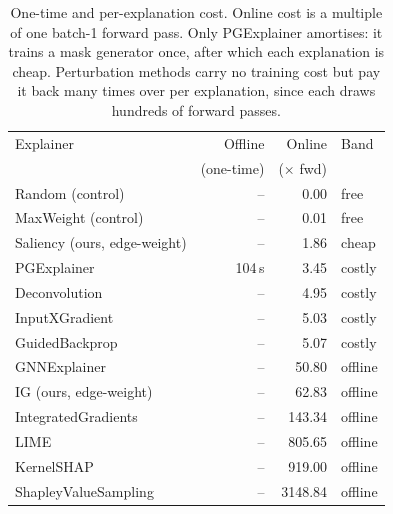 \begin{table}[t]
\centering
\small
\caption{One-time and per-explanation cost. Online cost is a multiple of one batch-1 forward pass. Only PGExplainer amortises: it trains a mask generator once, after which each explanation is cheap. Perturbation methods carry no training cost but pay it back many times over per explanation, since each draws hundreds of forward passes.}
\label{tab:delay}
\begin{tabular}{lrrl}
\toprule
Explainer & Offline & Online & Band \\
 & (one-time) & ($\times$ fwd) & \\
\midrule
Random (control) & -- & 0.00 & free \\
MaxWeight (control) & -- & 0.01 & free \\
Saliency (ours, edge-weight) & -- & 1.86 & cheap \\
PGExplainer & 104\,s & 3.45 & costly \\
Deconvolution & -- & 4.95 & costly \\
InputXGradient & -- & 5.03 & costly \\
GuidedBackprop & -- & 5.07 & costly \\
GNNExplainer & -- & 50.80 & offline \\
IG (ours, edge-weight) & -- & 62.83 & offline \\
IntegratedGradients & -- & 143.34 & offline \\
LIME & -- & 805.65 & offline \\
KernelSHAP & -- & 919.00 & offline \\
ShapleyValueSampling & -- & 3148.84 & offline \\
\bottomrule
\end{tabular}
\end{table}
